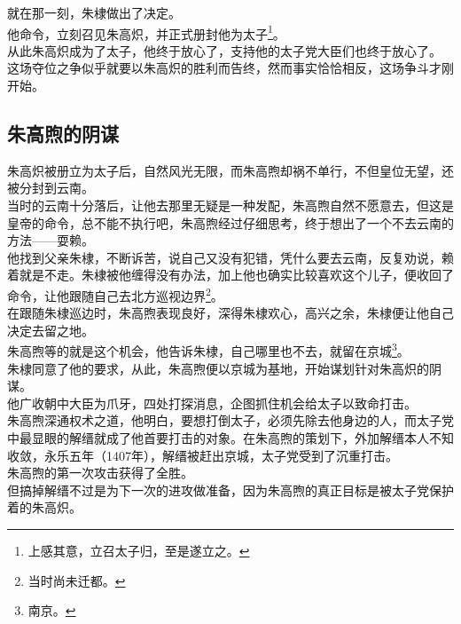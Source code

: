 \begin{multicols}{\theparacolNo}
就在那一刻，朱棣做出了决定。\\

他命令，立刻召见朱高炽，并正式册封他为太子\footnote{上感其意，立召太子归，至是遂立之。}。\\

从此朱高炽成为了太子，他终于放心了，支持他的太子党大臣们也终于放心了。\\

这场夺位之争似乎就要以朱高炽的胜利而告终，然而事实恰恰相反，这场争斗才刚开始。\\

\subsection{朱高煦的阴谋}
朱高炽被册立为太子后，自然风光无限，而朱高煦却祸不单行，不但皇位无望，还被分封到云南。\\

当时的云南十分落后，让他去那里无疑是一种发配，朱高煦自然不愿意去，但这是皇帝的命令，总不能不执行吧，朱高煦经过仔细思考，终于想出了一个不去云南的方法——耍赖。\\

他找到父亲朱棣，不断诉苦，说自己又没有犯错，凭什么要去云南，反复劝说，赖着就是不走。朱棣被他缠得没有办法，加上他也确实比较喜欢这个儿子，便收回了命令，让他跟随自己去北方巡视边界\footnote{当时尚未迁都。}。\\

在跟随朱棣巡边时，朱高煦表现良好，深得朱棣欢心，高兴之余，朱棣便让他自己决定去留之地。\\

朱高煦等的就是这个机会，他告诉朱棣，自己哪里也不去，就留在京城\footnote{南京。}。\\

朱棣同意了他的要求，从此，朱高煦便以京城为基地，开始谋划针对朱高炽的阴谋。\\

他广收朝中大臣为爪牙，四处打探消息，企图抓住机会给太子以致命打击。\\

朱高煦深通权术之道，他明白，要想打倒太子，必须先除去他身边的人，而太子党中最显眼的解缙就成了他首要打击的对象。在朱高煦的策划下，外加解缙本人不知收敛，永乐五年（1407年），解缙被赶出京城，太子党受到了沉重打击。\\

朱高煦的第一次攻击获得了全胜。\\

但搞掉解缙不过是为下一次的进攻做准备，因为朱高煦的真正目标是被太子党保护着的朱高炽。\\


\end{multicols}
